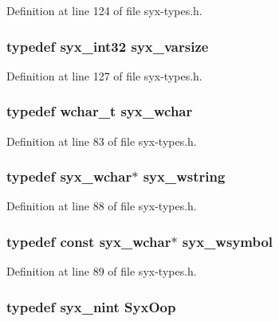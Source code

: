Definition at line 124 of file syx-types.h.\hypertarget{syx-types_8h_18e1a1417591a1efb670b97ce320f535}{
\subsubsection{\setlength{\rightskip}{0pt plus 5cm}typedef {\bf syx\_\-int32} {\bf syx\_\-varsize}}}
\label{syx-types_8h_18e1a1417591a1efb670b97ce320f535}




Definition at line 127 of file syx-types.h.\hypertarget{syx-types_8h_a9acd2e71d424e11b9124acd0d3bae12}{
\subsubsection{\setlength{\rightskip}{0pt plus 5cm}typedef wchar\_\-t {\bf syx\_\-wchar}}}
\label{syx-types_8h_a9acd2e71d424e11b9124acd0d3bae12}




Definition at line 83 of file syx-types.h.\hypertarget{syx-types_8h_049e6bf08a24efd298a398b5e8c27ead}{
\subsubsection{\setlength{\rightskip}{0pt plus 5cm}typedef {\bf syx\_\-wchar}$\ast$ {\bf syx\_\-wstring}}}
\label{syx-types_8h_049e6bf08a24efd298a398b5e8c27ead}




Definition at line 88 of file syx-types.h.\hypertarget{syx-types_8h_6fab7c0dab70ca1ee8812c0b5a6e0819}{
\subsubsection{\setlength{\rightskip}{0pt plus 5cm}typedef const {\bf syx\_\-wchar}$\ast$ {\bf syx\_\-wsymbol}}}
\label{syx-types_8h_6fab7c0dab70ca1ee8812c0b5a6e0819}




Definition at line 89 of file syx-types.h.\hypertarget{syx-types_8h_1121caba2d40b2ce090b640762744ccd}{
\subsubsection{\setlength{\rightskip}{0pt plus 5cm}typedef {\bf syx\_\-nint} {\bf SyxOop}}}
\label{syx-types_8h_1121caba2d40b2ce090b640762744ccd}




